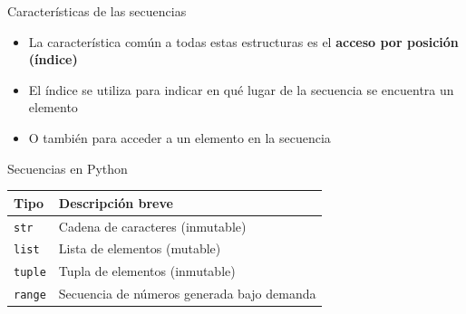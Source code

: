 \documentclass{beamer}
\begin{document}
    \begin{frame}{Características de las secuencias}
        \begin{itemize}
            \item La característica común a todas estas estructuras es el \textbf{acceso por posición (índice)}
            \item El índice se utiliza para indicar en qué lugar de la secuencia se encuentra un elemento
            \item O también para acceder a un elemento en la secuencia
        \end{itemize}
    \end{frame}

    \begin{frame}[fragile,t]{Secuencias en Python}
        \begin{center}
        \begin{tabular}{|l|l|}
        \hline
        \textbf{Tipo} & \textbf{Descripción breve} \\
        \hline
        \texttt{str}   & Cadena de caracteres (inmutable) \\
        \texttt{list}  & Lista de elementos (mutable) \\
        \texttt{tuple} & Tupla de elementos (inmutable) \\
        \texttt{range} & Secuencia de números generada bajo demanda \\
        \hline
        \end{tabular}
        \end{center}
    \end{frame}
\end{document}
